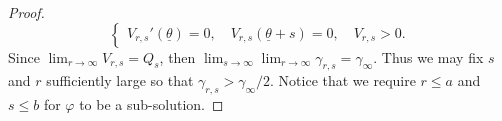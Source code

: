\documentclass[11pt]{article}    %
\newcommand{\EB}[1]{\textcolor{blue}{#1}}
\begin{document}
\begin{proof}
\begin{equation*}
\begin{cases}
V_{r,s}'(\underline\theta) = 0, \quad V_{r,s}(\underline\theta + s) = 0, \quad V_{r,s} > 0.
\end{cases}
\end{equation*}
Since $\lim_{r\to\infty} V_{r,s} = Q_s$, then  $\lim_{s\to\infty}\lim_{r\to\infty} \gamma_{r,s} = \gamma_\infty$.
Thus we may fix %
$s$ and $r$ sufficiently large so that $\gamma_{r,s} > \gamma_\infty/2$.  Notice that we require $r \leq a$ and $s \leq b$ for $\varphi$ to be a sub-solution.


\end{proof}
\end{document}

